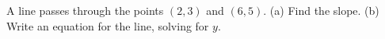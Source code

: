 A line passes through the points $(2,3)$ and $(6,5)$. 
(a) Find the slope.
(b) Write an equation for the line, solving for $y$.\answercheck

